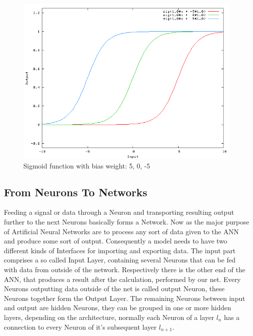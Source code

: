 \begin{figure}[H]
	\centering
	\includegraphics[width=\textwidth]{images/sigmoid.png}
	\caption{Sigmoid function with bias weight: 5, 0, -5{\cite{sigmoid}}}
	\label{fig:sigmoid}
	
\end{figure}


\subsection{From Neurons To Networks}
Feeding a signal or data through a Neuron and transporting resulting output further to the next Neurons basically forms a Network. Now as the major purpose of Artificial Neural Networks are to process any sort of data given to the ANN and produce some sort of output. Consequently a model needs to have two different kinds of Interfaces for importing and exporting data. \newline
The input part comprises a so called Input Layer, containing several Neurons that can be fed with data from outside of the network. Respectively there is the other end of the ANN, that produces a result after the calculation, performed by our net. Every Neurons outputting data outside of the net is called output Neuron, these Neurons together form the Output Layer. The remaining Neurons between input and output are hidden Neurons, they can be grouped in one or more hidden layers, depending on the architecture, normally each Neuron of a layer $l_{n}$ has a connection to every Neuron of it's subsequent layer $l_{n+1}$.

